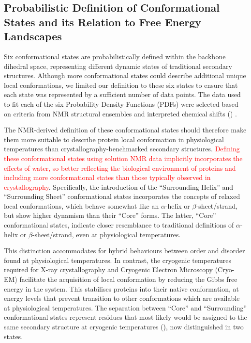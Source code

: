\subsection{Probabilistic Definition of Conformational States and its Relation to Free Energy Landscapes}

Six conformational states are probabilistically defined within the backbone dihedral space, representing different dynamic states of traditional secondary structures. Although more conformational states could describe additional unique local conformations, we limited our definition to these six states to ensure that each state was represented by a sufficient number of data points. The data used to fit each of the six Probability Density Functions (PDFs) were selected based on criteria from NMR structural ensembles and interpreted chemical shifts () \cite{orlando_shiftcrypt_2020}. 

The NMR-derived definition of these conformational states should therefore make them more suitable to describe protein local conformation in physiological temperatures than crystallography-benchmarked secondary structures. \textcolor{red}{Defining these conformational states using solution NMR data implicitly incorporates the effects of water, so better reflecting the biological environment of proteins and including more conformational states than those typically observed in crystallography}. Specifically, the introduction of the ``Surrounding Helix'' and ``Surrounding Sheet'' conformational states incorporates the concepts of relaxed local conformations, which behave somewhat like an $\alpha$-helix or $\beta$-sheet/strand, but show higher dynamism than their ``Core'' forms. The latter, ``Core'' conformational states, indicate closer resemblance to traditional definitions of $\alpha$-helix or $\beta$-sheet/strand, even at physiological temperatures. 

This distinction accommodates for hybrid behaviours between order and disorder found at physiological temperatures. In contrast, the cryogenic temperatures required for X-ray crystallography and Cryogenic Electron Microscopy (Cryo-EM) facilitate the acquisition of local conformation by reducing the Gibbs free energy in the system. This stabilises proteins into their native conformation, at energy levels that prevent transition to other conformations which are available at physiological temperatures. The separation between ``Core'' and ``Surrounding'' conformational states represent residues that most likely would be assigned to the same secondary structure at cryogenic temperatures (), now distinguished in two states. 

